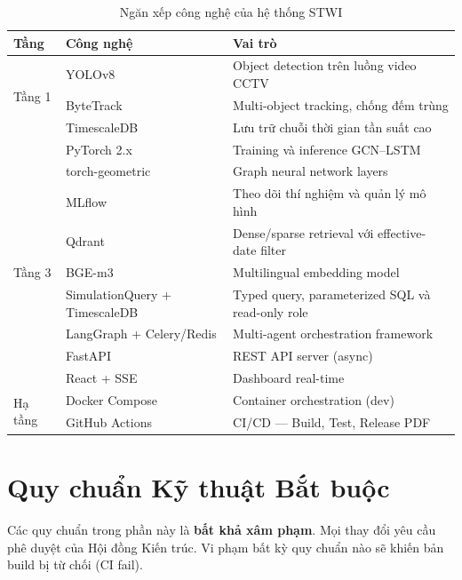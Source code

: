 \begin{table}[H]
\centering
\caption{Ngăn xếp công nghệ của hệ thống STWI}
\label{tab:techstack}
\renewcommand{\arraystretch}{1.4}
\begin{tabular}{p{2.5cm} p{3.5cm} p{6.2cm}}
\toprule
\textbf{Tầng} & \textbf{Công nghệ} & \textbf{Vai trò} \\
\midrule
\multirow{3}{*}{Tầng 1} & YOLOv8 & Object detection trên luồng video CCTV \\
  & ByteTrack & Multi-object tracking, chống đếm trùng \\
  & TimescaleDB & Lưu trữ chuỗi thời gian tần suất cao \\
\midrule
\rowcolor{rowgray}
\multirow{3}{*}{Tầng 2} & PyTorch 2.x & Training và inference GCN–LSTM \\
\rowcolor{rowgray}
  & torch-geometric & Graph neural network layers \\
\rowcolor{rowgray}
  & MLflow & Theo dõi thí nghiệm và quản lý mô hình \\
\midrule
\multirow{3}{*}{Tầng 3} & Qdrant & Dense/sparse retrieval với effective-date filter \\
  & BGE-m3 & Multilingual embedding model \\
  & SimulationQuery + TimescaleDB & Typed query, parameterized SQL và read-only role \\
\midrule
\rowcolor{rowgray}
\multirow{3}{*}{Tầng 4} & LangGraph + Celery/Redis & Multi-agent orchestration framework \\
\rowcolor{rowgray}
  & FastAPI & REST API server (async) \\
\rowcolor{rowgray}
  & React + SSE & Dashboard real-time \\
\midrule
\multirow{2}{*}{Hạ tầng} & Docker Compose & Container orchestration (dev) \\
  & GitHub Actions & CI/CD --- Build, Test, Release PDF \\
\bottomrule
\end{tabular}
\end{table}

\section{Quy chuẩn Kỹ thuật Bắt buộc}

\begin{tcolorbox}[dangerbox]
Các quy chuẩn trong phần này là \textbf{bất khả xâm phạm}. Mọi thay đổi yêu cầu phê duyệt của Hội đồng Kiến trúc. Vi phạm bất kỳ quy chuẩn nào sẽ khiến bản build bị từ chối (CI fail).
\end{tcolorbox}


